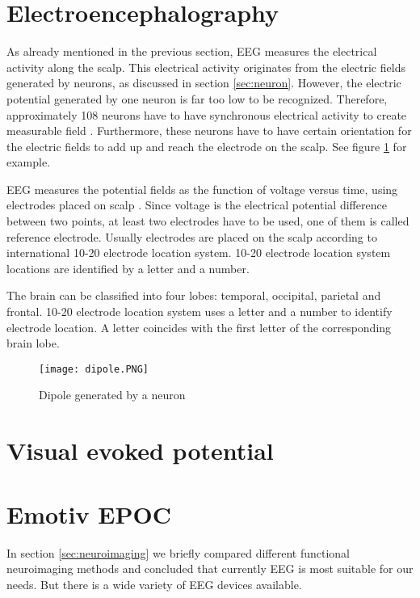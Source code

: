 \section{Electroencephalography}

As already mentioned in the previous section, \acrshort{EEG} measures the electrical activity along the scalp. This electrical activity originates from the electric fields generated by neurons, as discussed in section \ref{sec:neuron}. However, the electric potential generated by one neuron is far too low to be recognized. Therefore, approximately 108 neurons have to have synchronous electrical activity to create measurable field \cite{field_count}. Furthermore, these neurons have to have certain orientation for the electric fields to add up and reach the electrode on the scalp. See figure \ref{fig:dipole} for example.

\acrshort{EEG} measures the potential fields as the function of voltage versus time, using electrodes placed on scalp \cite{field_count}. Since voltage is the electrical potential difference between two points, at least two electrodes have to be used, one of them is called reference electrode. Usually electrodes are placed on the scalp according to international 10-20 electrode location system. 10-20 electrode location system locations are identified by a letter and a number.

The brain can be classified into four lobes: temporal, occipital, parietal and frontal. 10-20 electrode location system uses a letter and a number to identify electrode location. A letter coincides with the first letter of the corresponding brain lobe.

\begin{figure}[h]
	\centering
	\texttt{[image: dipole.PNG]}
	\caption{Dipole generated by a neuron \cite[p.~669]{neuroscience}}
	\label{fig:dipole}
\end{figure}

\section{Visual evoked potential}

\section{Emotiv EPOC}

In section \ref{sec:neuroimaging} we briefly compared different functional neuroimaging methods and concluded that currently \acrshort{EEG} is most suitable for our needs. But there is a wide variety of EEG devices available. 
 